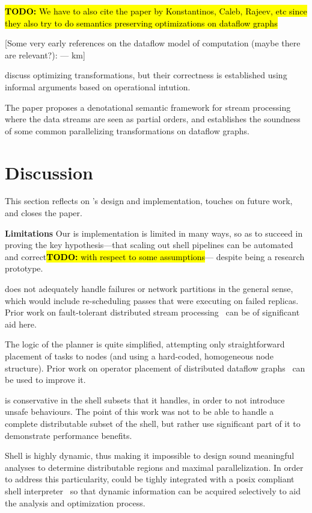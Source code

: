 \documentclass[sigplan,10pt,review,anonymous]{acmart}
\newcommand{\heading}[1]{\vspace{4pt}\noindent\textbf{#1}\enspace}
\newcommand{\TODO}[1]{\hl{\textbf{TODO:} #1}\xspace}
\newcommand{\km}[1]{[{\color{blue}#1 --- km}]}
\begin{document}
\TODO{We have to also cite the paper by Konstantinos, Caleb, Rajeev,
  etc since they also try to do semantics preserving optimizations on
  dataflow graphs}

\km{Some very early references on the dataflow model of computation (maybe there are relevant?): \cite{KM1966, D1974Dataflow, K1974KPN, KMacQ1977}}
  
\cite{HSSGG2014, SHGW2015} discuss optimizing transformations, but their correctness is established using informal arguments based on operational intution.
  
The paper \cite{MSAIT2019} proposes a denotational semantic framework for stream processing where the data streams are seen as partial orders, and establishes the soundness of some common parallelizing transformations on dataflow graphs.


\section{Discussion}
\label{discussion}

This section reflects on \sys's design and implementation, touches on future work, and closes the paper.

\heading{Limitations}
Our is implementation is limited in many ways, so as to succeed in proving the key hypothesis---that scaling out shell pipelines can be automated and correct\TODO{with respect to some assumptions}--- despite \sys being a research prototype.

\sys does not adequately handle failures or network partitions in the general sense, which would include re-scheduling passes that were executing on failed replicas.
Prior work on fault-tolerant distributed stream processing~\cite{} can be of significant aid here.

The logic of the planner is quite simplified, attempting only straightforward placement of tasks to nodes (and using a hard-coded, homogeneous node structure).
Prior work on operator placement of distributed dataflow graphs~\cite{} can be used to improve it.

\sys is conservative in the shell subsets that it handles, in order to
not introduce unsafe behaviours. The point of this work was not to be
able to handle a complete distributable subset of the shell, but
rather use significant part of it to demonstrate performance benefits.

Shell is highly dynamic, thus making it impossible to design sound
meaningful analyses to determine distributable regions and maximal
parallelization. In order to address this particularity, \sys could be
tighly integrated with a posix compliant shell
interpreter~\cite{smoosh:20} so that dynamic information can be
acquired selectively to aid the analysis and optimization process.
\end{document}

